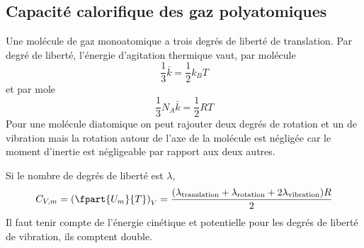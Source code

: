\subsection{Capacité calorifique des gaz polyatomiques}
Une molécule de gaz monoatomique a trois degrés de liberté de translation.
Par degré de liberté, l'énergie d'agitation thermique vaut, par molécule
\[ \frac 13 \bar k = \frac 12 k_BT \]
et par mole
\[ \frac 13 N_A \bar k = \frac 12 RT \]
Pour une molécule diatomique on peut rajouter deux degrés de rotation et
un de vibration mais la rotation autour de l'axe de la molécule est négligée
car le moment d'inertie est négligeable par rapport aux deux autres.

Si le nombre de degrés de liberté est $\lambda$,
\[ C_{V,m} = \left(\fpart{U_m}{T}\right)_V =
\frac{(\lambda_\mathrm{translation} + \lambda_\mathrm{rotation} +
2\lambda_\mathrm{vibration})R}2 \]
Il faut tenir compte de l'énergie cinétique et potentielle
pour les degrés de liberté de vibration, ils comptent double.

